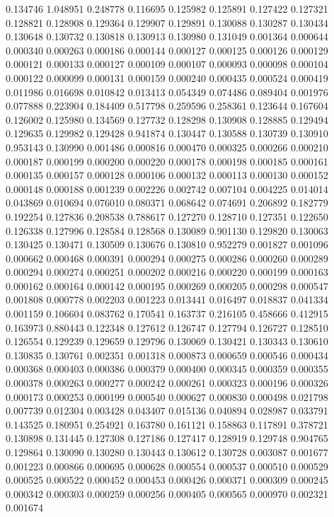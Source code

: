 0.134746
1.048951
0.248778
0.116695
0.125982
0.125891
0.127422
0.127321
0.128821
0.128908
0.129364
0.129907
0.129891
0.130088
0.130287
0.130434
0.130648
0.130732
0.130818
0.130913
0.130980
0.131049
0.001364
0.000644
0.000340
0.000263
0.000186
0.000144
0.000127
0.000125
0.000126
0.000129
0.000121
0.000133
0.000127
0.000109
0.000107
0.000093
0.000098
0.000104
0.000122
0.000099
0.000131
0.000159
0.000240
0.000435
0.000524
0.000419
0.011986
0.016698
0.010842
0.013413
0.054349
0.074486
0.089404
0.001976
0.077888
0.223904
0.184409
0.517798
0.259596
0.258361
0.123644
0.167604
0.126002
0.125980
0.134569
0.127732
0.128298
0.130908
0.128885
0.129494
0.129635
0.129982
0.129428
0.941874
0.130447
0.130588
0.130739
0.130910
0.953143
0.130990
0.001486
0.000816
0.000470
0.000325
0.000266
0.000210
0.000187
0.000199
0.000200
0.000220
0.000178
0.000198
0.000185
0.000161
0.000135
0.000157
0.000128
0.000106
0.000132
0.000113
0.000130
0.000152
0.000148
0.000188
0.001239
0.002226
0.002742
0.007104
0.004225
0.014014
0.043869
0.010694
0.076010
0.080371
0.068642
0.074691
0.206892
0.182779
0.192254
0.127836
0.208538
0.788617
0.127270
0.128710
0.127351
0.122650
0.126338
0.127996
0.128584
0.128568
0.130089
0.901130
0.129820
0.130063
0.130425
0.130471
0.130509
0.130676
0.130810
0.952279
0.001827
0.001096
0.000662
0.000468
0.000391
0.000294
0.000275
0.000286
0.000260
0.000289
0.000294
0.000274
0.000251
0.000202
0.000216
0.000220
0.000199
0.000163
0.000162
0.000164
0.000142
0.000195
0.000269
0.000205
0.000298
0.000547
0.001808
0.000778
0.002203
0.001223
0.013441
0.016497
0.018837
0.041334
0.001159
0.106604
0.083762
0.170541
0.163737
0.216105
0.458666
0.412915
0.163973
0.880443
0.122348
0.127612
0.126747
0.127794
0.126727
0.128510
0.126554
0.129239
0.129659
0.129796
0.130069
0.130421
0.130343
0.130610
0.130835
0.130761
0.002351
0.001318
0.000873
0.000659
0.000546
0.000434
0.000368
0.000403
0.000386
0.000379
0.000400
0.000345
0.000359
0.000355
0.000378
0.000263
0.000277
0.000242
0.000261
0.000323
0.000196
0.000326
0.000173
0.000253
0.000199
0.000540
0.000627
0.000830
0.000498
0.021798
0.007739
0.012304
0.003428
0.043407
0.015136
0.040894
0.028987
0.033791
0.143525
0.180951
0.254921
0.163780
0.161121
0.158863
0.117891
0.378721
0.130898
0.131445
0.127308
0.127186
0.127417
0.128919
0.129748
0.904765
0.129864
0.130090
0.130280
0.130443
0.130612
0.130728
0.003087
0.001677
0.001223
0.000866
0.000695
0.000628
0.000554
0.000537
0.000510
0.000529
0.000525
0.000522
0.000452
0.000453
0.000426
0.000371
0.000309
0.000245
0.000342
0.000303
0.000259
0.000256
0.000405
0.000565
0.000970
0.002321
0.001674
